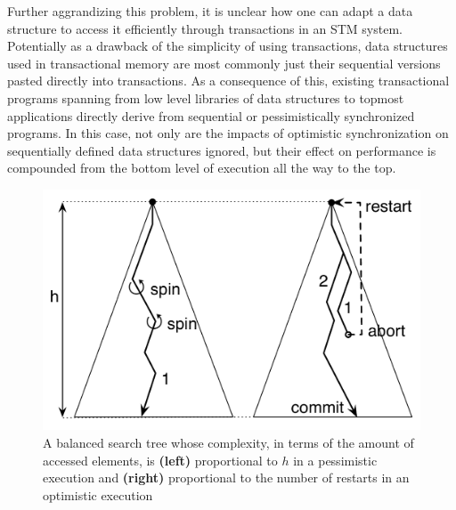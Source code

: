
Further aggrandizing this problem, it is unclear how one can adapt a data structure to 
access it efficiently through transactions in an STM system.
Potentially as a drawback of the simplicity of using transactions, 
data structures used in transactional memory are most commonly just
their sequential versions pasted directly into transactions.
As a consequence of this, existing transactional programs spanning from low level libraries of data structures to 
topmost applications directly derive from sequential or pessimistically synchronized programs.
In this case, not only are the impacts of optimistic synchronization on sequentially defined data structures
ignored, but their effect on performance is compounded from the bottom level of execution all the way to the top.

\begin{figure}[t]
	\begin{center}
	\includegraphics[scale=0.4]{Tree/fig/complexity}
	\caption{A balanced search tree whose complexity, in terms of the amount of accessed elements, is {\bf (left)} proportional to $h$ 
	in a pessimistic execution and {\bf (right)} proportional to the number of restarts in an optimistic execution\label{fig:complexity}}
	\end{center}
\end{figure}

